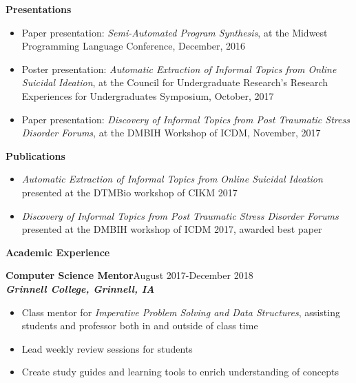 \documentclass[9pt]{extarticle}
\begin{document}
\begin{large}
\begin{center}\textbf{Presentations}
\end{center}
\end{large}
\begin{itemize}
\item Paper presentation: \textit{Semi-Automated Program Synthesis}, at the Midwest Programming Language Conference,
  December, 2016
\item Poster presentation: \textit{Automatic
  Extraction of Informal Topics from Online Suicidal Ideation}, at the Council for Undergraduate Research's 
  Research Experiences for Undergraduates Symposium, October, 2017
\item Paper presentation: \textit{Discovery of Informal Topics from Post Traumatic Stress
  Disorder Forums}, at the DMBIH Workshop of ICDM, November, 2017
\end{itemize}

\begin{large}
\begin{center}\textbf{Publications}
\end{center}
\end{large}
\begin{itemize}
\item \textit{Automatic
  Extraction of Informal Topics from Online Suicidal Ideation} presented at the
  DTMBio workshop of CIKM 2017
\item \textit{Discovery of Informal Topics from Post Traumatic Stress
  Disorder Forums} presented at the DMBIH workshop of ICDM 2017,
awarded best paper 
\end{itemize}
\vspace{0.4cm}

\begin{large}
\begin{center}\textbf{Academic Experience}
\end{center}
\end{large}
\textbf{Computer Science Mentor}\hfill August 2017-December 2018\\
\textbf{\textit{Grinnell College, Grinnell, IA}}
\begin{itemize}
  \item Class mentor for \textit{Imperative Problem Solving and Data
      Structures}, assisting students and professor both in and
    outside of class time
\item Lead weekly review sessions for students
\item Create study guides and learning tools to enrich understanding
  of concepts
\end{itemize}
\end{document}
